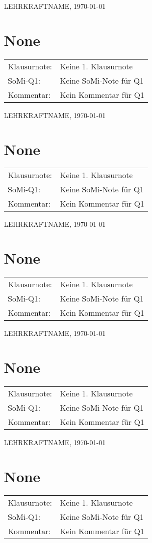 \documentclass[a6paper,10pt]{scrartcl}
\begin{document}
 \vfill LEHRKRAFTNAME, \today
 \clearpage
 
 
\section*{None} \begin{tabularx}{\textwidth}{lX}
 Klausurnote: &Keine 1. Klausurnote\\
 SoMi-Q1: &Keine SoMi-Note für Q1\\
 Kommentar: &Kein Kommentar für Q1\end{tabularx}

 \vfill LEHRKRAFTNAME, \today
 \clearpage
 
 
\section*{None} \begin{tabularx}{\textwidth}{lX}
 Klausurnote: &Keine 1. Klausurnote\\
 SoMi-Q1: &Keine SoMi-Note für Q1\\
 Kommentar: &Kein Kommentar für Q1\end{tabularx}

 \vfill LEHRKRAFTNAME, \today
 \clearpage
 
 
\section*{None} \begin{tabularx}{\textwidth}{lX}
 Klausurnote: &Keine 1. Klausurnote\\
 SoMi-Q1: &Keine SoMi-Note für Q1\\
 Kommentar: &Kein Kommentar für Q1\end{tabularx}

 \vfill LEHRKRAFTNAME, \today
 \clearpage
 
 
\section*{None} \begin{tabularx}{\textwidth}{lX}
 Klausurnote: &Keine 1. Klausurnote\\
 SoMi-Q1: &Keine SoMi-Note für Q1\\
 Kommentar: &Kein Kommentar für Q1\end{tabularx}

 \vfill LEHRKRAFTNAME, \today
 \clearpage
 
 
\section*{None} \begin{tabularx}{\textwidth}{lX}
 Klausurnote: &Keine 1. Klausurnote\\
 SoMi-Q1: &Keine SoMi-Note für Q1\\
 Kommentar: &Kein Kommentar für Q1\end{tabularx}
\end{document}
